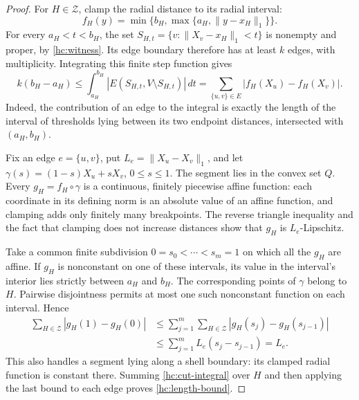 \documentclass[11pt]{amsart}
\theoremstyle{definition}
\theoremstyle{remark}
\numberwithin{equation}{section}
\begin{document}
\begin{proof}
For \(H\in\mathcal Z\), clamp the radial distance to its radial
interval:
\[
 f_H(y)=\min\{b_H,\max\{a_H,\|y-x_H\|_1\}\}.
\]
For every \(a_H<t<b_H\), the set
\(S_{H,t}=\{v:\|X_v-x_H\|_1<t\}\) is nonempty and proper, by
\eqref{hc:witness}.  Its edge boundary therefore has at least \(k\)
edges, with multiplicity.  Integrating this finite step function gives
\begin{equation}
\label{hc:cut-integral}
 k(b_H-a_H)
 \le \int_{a_H}^{b_H}|E(S_{H,t},V\setminus S_{H,t})|\,dt
 =\sum_{\{u,v\}\in E}|f_H(X_u)-f_H(X_v)|.
\end{equation}
Indeed, the contribution of an edge to the integral is exactly the
length of the interval of thresholds lying between its two endpoint
distances, intersected with \((a_H,b_H)\).

Fix an edge \(e=\{u,v\}\), put \(L_e=\|X_u-X_v\|_1\), and let
\(\gamma(s)=(1-s)X_u+sX_v\), \(0\le s\le1\).  The segment lies in
the convex set \(Q\).  Every \(g_H=f_H\circ\gamma\) is a continuous,
finitely piecewise affine function: each coordinate in its defining
norm is an absolute value of an affine function, and clamping adds
only finitely many breakpoints.  The reverse triangle inequality and
the fact that clamping does not increase distances show that
\(g_H\) is \(L_e\)-Lipschitz.

Take a common finite subdivision \(0=s_0<\cdots<s_m=1\) on which all
the \(g_H\) are affine.  If \(g_H\) is nonconstant on one of these
intervals, its value in the interval's interior lies strictly between
\(a_H\) and \(b_H\).  The corresponding points of \(\gamma\) belong
to \(H\).  Pairwise disjointness permits at most one such nonconstant
function on each interval.  Hence
\begin{align*}
 \sum_{H\in\mathcal Z}|g_H(1)-g_H(0)|
 &\le \sum_{j=1}^m\sum_{H\in\mathcal Z}
       |g_H(s_j)-g_H(s_{j-1})|\\
 &\le \sum_{j=1}^m L_e(s_j-s_{j-1})=L_e.
\end{align*}
This also handles a segment lying along a shell boundary: its clamped
radial function is constant there.  Summing
\eqref{hc:cut-integral} over \(H\) and then applying the last bound to
each edge proves \eqref{hc:length-bound}.
\end{proof}
\end{document}
